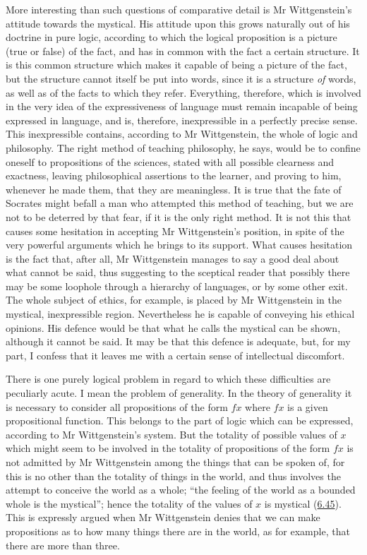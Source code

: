 \documentclass[12pt,oneside]{book}[2007/10/19]
\newcommand{\PropERef}[1]{\hyperref[PropE:#1]{#1}}
\begin{document}
More interesting than such questions of comparative
detail is Mr Wittgenstein's attitude towards the mystical.
His attitude upon this grows naturally out of his doctrine
in pure logic, according to which the logical proposition
is a picture (true or false) of the fact, and has in common
with the fact a certain structure. It is this common
structure which makes it capable of being a picture of
the fact, but the structure cannot itself be put into words,
since it is a structure \emph{of} words, as well as of the facts to
which they refer. Everything, therefore, which is involved
in the very idea of the expressiveness of language must
remain incapable of being expressed in language, and is,
therefore, inexpressible in a perfectly precise sense. This
inexpressible contains, according to Mr Wittgenstein, the
whole of logic and philosophy. The right method of
teaching philosophy, he says, would be to confine oneself
to propositions of the sciences, stated with all possible
clearness and exactness, leaving philosophical assertions
to the learner, and proving to him, whenever he made
them, that they are meaningless. It is true that the fate
of Socrates might befall a man who attempted this method
of teaching, but we are not to be deterred by that fear, if
it is the only right method. It is not this that causes
some hesitation in accepting Mr Wittgenstein's position,
in spite of the very powerful arguments which he brings
to its support. What causes hesitation is the fact that,
after all, Mr Wittgenstein manages to say a good deal
about what cannot be said, thus suggesting to the
sceptical reader that possibly there may be some loophole
through a hierarchy of languages, or by some other
exit. The whole subject of ethics, for example, is placed
by Mr Wittgenstein in the mystical, inexpressible region.
Nevertheless he is capable of conveying his ethical
opinions. His defence would be that what he calls the
mystical can be shown, although it cannot be said. It
may be that this defence is adequate, but, for my part,
I confess that it leaves me with a certain sense of
intellectual discomfort.

There is one purely logical problem in regard to
which these difficulties are peculiarly acute. I mean the
problem of generality. In the theory of generality it is
necessary to consider all propositions of the form $fx$ where
$fx$ is a given propositional function. This belongs to
the part of logic which can be expressed, according to
Mr Wittgenstein's system. But the totality of possible
values of $x$ which might seem to be involved in the totality
of propositions of the form $fx$ is not admitted by Mr
Wittgenstein among the things that can be spoken of,
for this is no other than the totality of things in the world,
and thus involves the attempt to conceive the world as a
whole; ``the feeling of the world as a bounded whole is
the mystical''; hence the totality of the values of $x$ is
mystical (\PropERef{6.45}). This is expressly argued when Mr
Wittgenstein denies that we can make propositions as
to how many things there are in the world, as for example,
that there are more than three.
\end{document}
